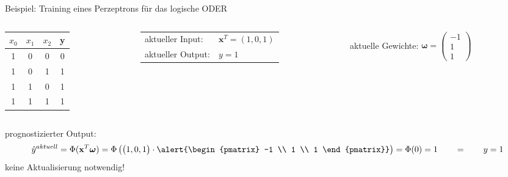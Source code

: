 \documentclass[11pt, aspectratio=169, t]{beamer}
\begin{document}
\begin{frame}{Beispiel: Training eines Perzeptrons für das logische ODER}
\begin{small}
\begin{columns}
\begin{column}{0.25\textwidth}
\hspace{0.5cm}
\begin{footnotesize}
\begin{tabular}{cccc} \toprule
$x_0$ & $x_1$ & $x_2$ & y \\ \midrule
1 & 0 & 0 & 0 \\
1 & 0 & 1 & 1 \\
1 & 1 & 0 & 1 \\
1 & 1 & 1 & 1 \\ \bottomrule
\end{tabular} \end{footnotesize}
\end{column}
\begin{column}{0.4\textwidth}
\begin{tabular}{ll}
aktueller Input: & $\mathbf{x}^{T} = (1, 0, 1)$ \\
aktueller Output: & $y=1$ \\
\end{tabular}
\end{column}
\begin{column}{0.4\textwidth}
aktuelle Gewichte: \alert{ $\boldsymbol{\omega} = \begin{pmatrix} -1 \\ 1 \\ 1 \end{pmatrix}$ }
\end{column}
\end{columns}
prognostizierter Output:
\[\hat{y}^{aktuell} = \Phi(\mathbf{x}^{T}\boldsymbol{\omega}) = \Phi\left( \begin{pmatrix} 1, 0, 1 \end{pmatrix}\cdot \alert{\begin{pmatrix} -1 \\ 1 \\ 1 \end{pmatrix}} \right) = \Phi(0) = 1 \qquad = \qquad y = 1\]
keine Aktualisierung notwendig!
\begin{align*} %
\phantom{\omega_0^{\text{neu}}} & \\
\phantom{\omega_1^{\text{neu}}} & \\
\phantom{\omega_2^{\text{neu}}} &
\end{align*}
\end{small}
\end{frame}
\end{document}
